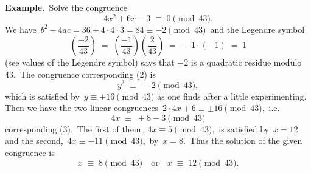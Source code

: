 \documentclass[12pt]{article}
\theoremstyle{definition}
\begin{document}
\textbf{Example.}\, Solve the congruence
$$4x^2+6x-3 \;\equiv\; 0 \pmod{43}.$$
We have\, $b^2\!-\!4ac = 36+4\cdot4\cdot3 = 84 \equiv -2 \pmod{43}$\, and the Legendre symbol
$$\left(\frac{-2}{43}\right) \;=\; \left(\frac{-1}{43}\right)\left(\frac{2}{43}\right) \;=\; -1\cdot(-1) \;=\; 1$$
(see values of the Legendre symbol) says that $-2$ is a quadratic residue modulo 43.\, The congruence corresponding (2) is
$$y^2 \;\equiv\; -2 \pmod{43},$$
which is satisfied by\, $y \equiv \pm16 \pmod{43}$ as one finds after a little experimenting.\, Then we have the two linear congruences\, $2\cdot4x+6 \equiv \pm16 \pmod{43}$,\, i.e.
$$4x \;\equiv\; \pm8-3 \pmod{43}$$
corresponding (3).\, The first of them,\, $4x\equiv 5 \pmod{43}$,\, is satisfied by\, $x = 12$\, and the second,\, $4x\equiv -11 \pmod{43}$,\, by\, $x = 8$.\, Thus the solution of the given congruence is
$$x \;\equiv\; 8 \pmod{43} \quad \mbox{or} \quad x \;\equiv\; 12 \pmod{43}.$$





\end{document}
